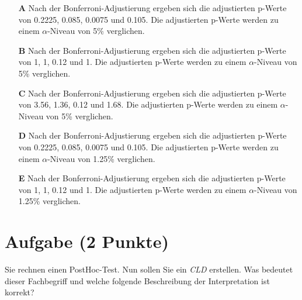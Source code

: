 \documentclass[a4paper, 9pt]{scrartcl}\usepackage[]{graphicx}\usepackage[]{xcolor}
\begin{document}
\begin{enumerate}
\item [\textbf{A} \msquare] Nach der Bonferroni-Adjustierung ergeben sich die adjustierten p-Werte von 0.2225, 0.085, 0.0075 und 0.105. Die adjustierten p-Werte werden zu einem $\alpha$-Niveau von 5\% verglichen.
\item [\textbf{B} \msquare] Nach der Bonferroni-Adjustierung ergeben sich die adjustierten p-Werte von 1, 1, 0.12 und 1. Die adjustierten p-Werte werden zu einem $\alpha$-Niveau von 5\% verglichen.
\item [\textbf{C} \msquare] Nach der Bonferroni-Adjustierung ergeben sich die adjustierten p-Werte von 3.56, 1.36, 0.12 und 1.68. Die adjustierten p-Werte werden zu einem $\alpha$-Niveau von 5\% verglichen.
\item [\textbf{D} \msquare] Nach der Bonferroni-Adjustierung ergeben sich die adjustierten p-Werte von 0.2225, 0.085, 0.0075 und 0.105. Die adjustierten p-Werte werden zu einem $\alpha$-Niveau von 1.25\% verglichen.
\item [\textbf{E} \msquare] Nach der Bonferroni-Adjustierung ergeben sich die adjustierten p-Werte von 1, 1, 0.12 und 1. Die adjustierten p-Werte werden zu einem $\alpha$-Niveau von 1.25\% verglichen.
\end{enumerate}

\section{Aufgabe \hfill (2 Punkte)}



Sie rechnen einen PostHoc-Test. Nun sollen Sie ein \textit{CLD} erstellen. Was bedeutet dieser Fachbegriff und welche folgende Beschreibung der Interpretation ist korrekt?
\end{document}
